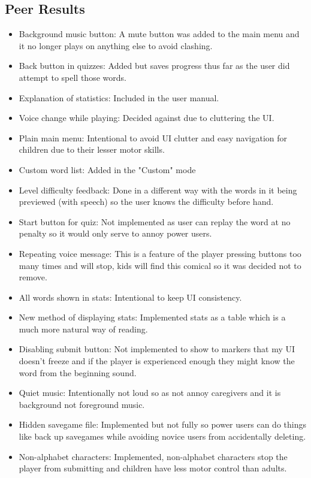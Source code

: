 \documentclass[conference]{IEEEtran}
\begin{document}
	\subsection{Peer Results}
		\begin{itemize}
			\item Background music button: A mute button was added to the main menu and it no longer plays on anything else to avoid clashing.
			\item Back button in quizzes: Added but saves progress thus far as the user did attempt to spell those words.
			\item Explanation of statistics: Included in the user manual.
			\item Voice change while playing: Decided against due to cluttering the UI.
			\item Plain main menu: Intentional to avoid UI clutter and easy navigation for children due to their lesser motor skills.
			\item Custom word list: Added in the "Custom" mode
			\item Level difficulty feedback: Done in a different way with the words in it being previewed (with speech) so the user knows the difficulty before hand.
			\item Start button for quiz: Not implemented as user can replay the word at no penalty so it would only serve to annoy power users.
			\item Repeating voice message: This is a feature of the player pressing buttons too many times and will stop, kids will find this comical so it was decided not to remove.
			\item All words shown in stats: Intentional to keep UI consistency.
			\item New method of displaying stats: Implemented stats as a table which is a much more natural way of reading.
			\item Disabling submit button: Not implemented to show to markers that my UI doesn't freeze and if the player is experienced enough they might know the word from the beginning sound. 
			\item Quiet music: Intentionally not loud so as not annoy caregivers and it is background not foreground music.
			\item Hidden savegame file: Implemented but not fully so power users can do things like back up savegames while avoiding novice users from accidentally deleting.
			\item Non-alphabet characters: Implemented, non-alphabet characters stop the player from submitting and children have less motor control than adults.

\end{itemize}
\end{document}
